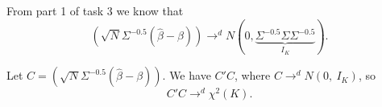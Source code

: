 \documentclass[12pt, a4paper]{article}\usepackage[]{graphicx}\usepackage[]{color}
\begin{document}
From part 1 of task 3 we know that
\[\left( \sqrt{N} \Sigma^{-0.5} \left( \hat\beta-\beta \right) \right) \rightarrow^d N(0, \underbrace{ \Sigma^{-0.5}\Sigma \Sigma^{-0.5} }_{I_K}). \]

Let $C = \left( \sqrt{N} \Sigma^{-0.5} \left( \hat\beta-\beta \right) \right)$.
We have $C' C$, where $ C \rightarrow^d N(0,\ I_K)$, so 
\[ C' C \rightarrow^d \chi^2 (K). \]


















\end{document}

